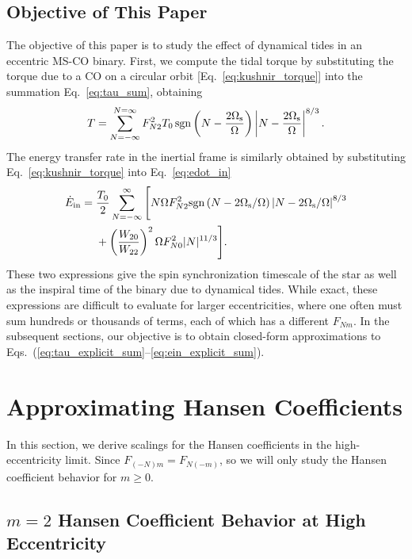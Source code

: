 \documentclass[
        fleqn,
        usenatbib,
    ]{mnras}
\begin{document}
\subsection{Objective of This Paper}\label{ss:objective}

The objective of this paper is to study the effect of dynamical tides in an
eccentric MS-CO binary. First, we compute the tidal torque by substituting the
torque due to a CO on a circular orbit [Eq.~\eqref{eq:kushnir_torque}] into the
summation Eq.~\eqref{eq:tau_sum}, obtaining
\begin{equation}
    T = \sum_{N = -\infty}^{N = \infty} F_{N2}^2 T_0
        \,\mathrm{sgn}\left(N - \frac{2\Omega_{\rm s}}{ \Omega}\right) \left|N -
        \frac{2 \Omega_{\rm s}}{\Omega}\right|^{8/3}.\label{eq:tau_explicit_sum}
\end{equation}
The energy transfer rate in the inertial frame is similarly obtained by
substituting Eq.~\eqref{eq:kushnir_torque} into Eq.~\eqref{eq:edot_in}
\begin{align}
    \dot{E}_{\rm in} ={}& \frac{T_0}{2}
        \sum_{N = -\infty}^{\infty} \Bigg[
            N\Omega F_{N2}^2 \mathrm{sgn}\left(N - 2\Omega_{\rm s} / \Omega\right)
                    \left|N - 2 \Omega_{\rm s} / \Omega\right|^{8/3}\nonumber\\
            &+ \left(\frac{W_{20}}{W_{22}}\right)^2 \Omega
                    F_{N0}^2 |N|^{11/3}
            \Bigg].\label{eq:ein_explicit_sum}
\end{align}
These two expressions give the spin synchronization timescale of the star as
well as the inspiral time of the binary due to dynamical tides. While exact,
these expressions are difficult to evaluate for larger eccentricities, where one
often must sum hundreds or thousands of terms, each of which has a different
$F_{Nm}$. In the subsequent sections, our objective is to obtain closed-form
approximations to Eqs.~(\ref{eq:tau_explicit_sum}--\ref{eq:ein_explicit_sum}).

\section{Approximating Hansen Coefficients}\label{s:hansens}

In this section, we derive scalings for the Hansen coefficients in the
high-eccentricity limit. Since $F_{(-N)m} = F_{N(-m)}$, so we will only study
the Hansen coefficient behavior for $m \geq 0$.

\subsection{$m=2$ Hansen Coefficient Behavior at High Eccentricity}
\end{document}
